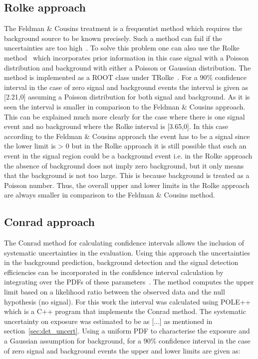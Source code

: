 \subsection{Rolke approach}
\label{subsec:Rolke}
The Feldman \& Cousins treatment is a frequentist method which requires the background source to be known precisely. Such a method can fail if the uncertainties are too high~\cite{Rolke:2000ij}. To solve this problem one can also use the Rolke method~\cite{Rolke:2004mj} which incorporates prior information in this case signal with a Poisson distribution and background with either a Poisson or Gaussian distribution. The method is implemented as a ROOT class under TRolke~\cite{TRolke_ROOT}. For a 90\% confidence interval in the case of zero signal and background events the interval is given as [2.21,0] assuming a Poisson distribution for both signal and background. As it is seen the interval is smaller in comparison to the Feldman \& Cousins approach. This can be explained much more clearly for the case where there is one signal event and no background where the Rolke interval is [3.65,0]. In this case according to the Feldman \& Cousins approach the event has to be a signal since the lower limit is > 0 but in the Rolke approach it is still possible that such an event in the signal region could be a background event i.e. in the Rolke approach the absence of background does not imply zero background, but it only means that the background is not too large. This is because background is treated as a Poisson number. Thus, the overall upper and lower limits in the Rolke approach are always smaller in comparison to the Feldman \& Cousins  method. 

\subsection{Conrad approach}
\label{subsec:Conrad}
The Conrad method for calculating confidence intervals allows the inclusion of systematic uncertainties in the evaluation. Using this approach the uncertainties in the background prediction, background detection and the signal detection efficiencies can be incorporated in the confidence interval calculation by integrating over the PDFs of these parameters~\cite{Conrad:2002kn}. The method computes the upper limit based on a likelihood ratio between the observed data and the null hypothesis (no signal). For this work the interval was calculated using POLE++~\cite{Conrad:2005zm} which is a C++ program that implements the Conrad method. The systematic uncertainty on exposure was estimated to be as [...] as mentioned in section~\ref{sec:det_uncert}. Using a uniform PDF to characterise the exposure and a Gaussian assumption for background, for a 90\% confidence interval in the case of zero signal and background events the upper and lower limits are given as: 

